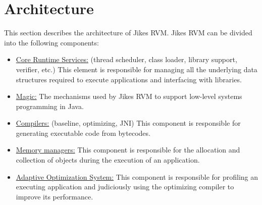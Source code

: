 \documentclass[a4paper,oneside]{book}
\begin{document}


























\part{Architecture}
\label{part:architecture}

This section describes the architecture of Jikes RVM. Jikes RVM can be divided into the following components:

\begin{itemize}
  \item \hyperref[cha:coreruntimeservices]{Core Runtime Services:} (thread scheduler, class loader, library support, verifier, etc.) This element is responsible for managing all the underlying data structures required to execute applications and interfacing with libraries.
  \item \hyperref[cha:magic]{Magic:} The mechanisms used by Jikes RVM to support low-level systems programming in Java.
  \item \hyperref[cha:compilers]{Compilers:} (baseline, optimizing, JNI) This component is responsible for generating executable code from bytecodes.
  \item \hyperref[cha:mmtk]{Memory managers:} This component is responsible for the allocation and collection of objects during the execution of an application.
  \item \hyperref[cha:adaptiveoptimizationsystem]{Adaptive Optimization System:} This component is responsible for profiling an executing application and judiciously using the optimizing compiler to improve its performance.
\end{itemize}


\end{document}
